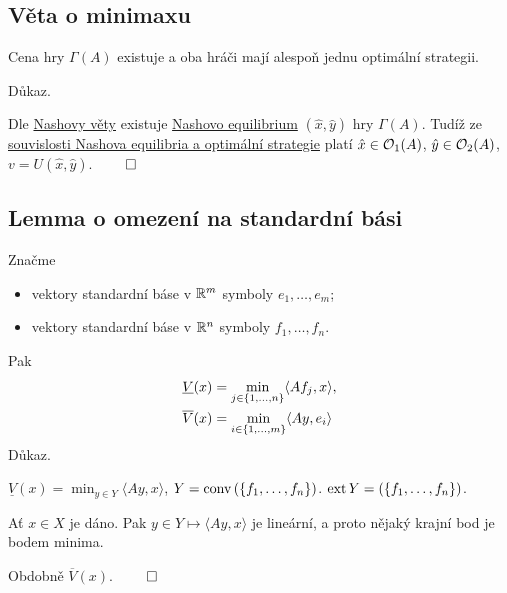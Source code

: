 \subsection{Věta o minimaxu}
Cena hry $\Gamma(A)$ existuje a oba hráči mají alespoň jednu optimální strategii.

Důkaz.

Dle \hyperref[nashV]{Nashovy věty} existuje \hyperref[nash]{Nashovo equilibrium} $(\hat x, \hat y)$ hry $\Gamma(A)$. 
Tudíž ze \hyperref[nashOpt]{souvislosti Nashova equilibria a optimální strategie} platí $\hat x \in \mathcal{O}_1(A)$, 
$\hat y \in \mathcal{O}_2(A)$, $v = U(\hat x, \hat y)$. $\qed$

\newpage
\subsection{Lemma o omezení na standardní bási}
Značme
\begin{itemize}
    \item vektory standardní báse v $\mathbb{R}^m$ symboly $e_1, \dots, e_m$;
    \item vektory standardní báse v $\mathbb{R}^n$ symboly $f_1, \dots, f_n$.
\end{itemize}
Pak
\begin{align*}
    \underline{V}(x) &= \min_{j\in\left\lbrace 1, \dots, n \right\rbrace}\langle Af_j, x\rangle, \\
    \overline{V}(x)  &= \min_{i\in\left\lbrace 1, \dots, m \right\rbrace}\langle Ay, e_i\rangle
\end{align*}
Důkaz.

$\underline{V}(x) = \min_{y \in Y}\langle Ay, x\rangle$, $Y = \operatorname*{conv} \left(\left\lbrace f_1, \dots, f_n \right\rbrace\right)$. 
$\operatorname*{ext} Y = \left(\left\lbrace f_1, \dots, f_n \right\rbrace\right)$.

Ať $x \in X$ je dáno. Pak $y \in Y \mapsto \langle Ay, x\rangle$ je lineární, a proto nějaký krajní bod je bodem minima.

Obdobně $\overline{V}(x)$. $\qed$

